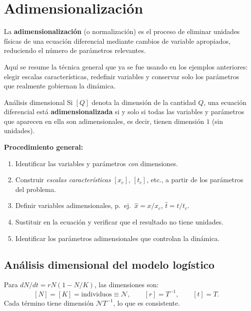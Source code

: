 \documentclass[11pt,letterpaper]{article}
\begin{document}
\section{Adimensionalización}
\label{sec:adimensionalizacion}

La \textbf{adimensionalización} (o normalización) es el proceso de eliminar
unidades físicas de una ecuación diferencial mediante cambios de variable
apropiados, reduciendo el número de parámetros relevantes.

Aquí se resume la técnica general que ya se fue usando en los ejemplos
anteriores: elegir escalas características, redefinir variables y conservar
solo los parámetros que realmente gobiernan la dinámica.

\begin{definicion}{Análisis dimensional}{}
Si $[Q]$ denota la dimensión de la cantidad $Q$, una ecuación diferencial
está \textbf{adimensionalizada} si y solo si todas las variables y parámetros
que aparecen en ella son adimensionales, es decir, tienen dimensión $1$ (sin unidades).
\end{definicion}

\textbf{Procedimiento general:}
\begin{enumerate}
    \item Identificar las variables y parámetros \emph{con} dimensiones.
    \item Construir \emph{escalas características} $[x_c]$, $[t_c]$, etc.,
          a partir de los parámetros del problema.
    \item Definir variables adimensionales, p.~ej.\ $\hat{x}=x/x_c$,
          $\hat{t}=t/t_c$.
    \item Sustituir en la ecuación y verificar que el resultado no tiene unidades.
    \item Identificar los parámetros adimensionales que controlan la dinámica.
\end{enumerate}

\subsection{Análisis dimensional del modelo logístico}

Para $dN/dt=rN(1-N/K)$, las dimensiones son:
\[
[N]=[K]=\text{individuos}\equiv\mathcal{N},\qquad
[r]=T^{-1},\qquad
[t]=T.
\]
Cada término tiene dimensión $\mathcal{N}T^{-1}$, lo que es consistente.
\end{document}

